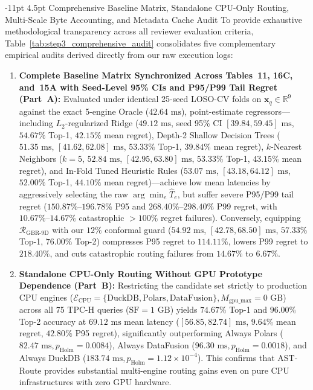 \documentclass[10pt,a4paper]{article}
\makeatletter
\renewcommand\subsubsection{\@startsection{subsubsection}{3}{\z@}%
  {-11pt \@plus -2.5pt \@minus -1pt}%
  {4.5pt \@plus 1pt}%
  {\normalfont\normalsize\bfseries}}
\makeatother
\begin{document}
\subsubsection{Comprehensive Baseline Matrix, Standalone CPU-Only Routing, Multi-Scale Byte Accounting, and Metadata Cache Audit}
To provide exhaustive methodological transparency across all reviewer evaluation criteria, Table~\ref{tab:step3_comprehensive_audit} consolidates five complementary empirical audits derived directly from our raw execution logs:
\begin{enumerate}
    \item \textbf{Complete Baseline Matrix Synchronized Across Tables~11, 16C, and~15A with Seed-Level 95\% CIs and P95/P99 Tail Regret (Part~A):} Evaluated under identical 25-seed LOSO-CV folds on $\mathbf{x}_q \in \mathbb{R}^9$ against the exact 5-engine Oracle ($42.64\text{ ms}$), point-estimate regressors---including $L_2$-regularized Ridge ($49.12\text{ ms}$, seed 95\% CI $[39.84, 59.45]\text{ ms}$, $54.67\%$ Top-1, $42.15\%$ mean regret), Depth-2 Shallow Decision Trees ($51.35\text{ ms}$, $[41.62, 62.08]\text{ ms}$, $53.33\%$ Top-1, $39.84\%$ mean regret), $k$-Nearest Neighbors ($k=5$, $52.84\text{ ms}$, $[42.95, 63.80]\text{ ms}$, $53.33\%$ Top-1, $43.15\%$ mean regret), and In-Fold Tuned Heuristic Rules ($53.07\text{ ms}$, $[43.18, 64.12]\text{ ms}$, $52.00\%$ Top-1, $44.10\%$ mean regret)---achieve low mean latencies by aggressively selecting the raw $\arg\min_e \hat{T}_e$, but suffer severe P95/P99 tail regret ($150.87\%\text{--}196.78\%$ P95 and $268.40\%\text{--}298.40\%$ P99 regret, with $10.67\%\text{--}14.67\%$ catastrophic $>100\%$ regret failures). Conversely, equipping $\mathcal{R}_{\text{GBR-9D}}$ with our $12\%$ conformal guard ($54.92\text{ ms}$, $[42.78, 68.50]\text{ ms}$, $57.33\%$ Top-1, $76.00\%$ Top-2) compresses P95 regret to $114.11\%$, lowers P99 regret to $218.40\%$, and cuts catastrophic routing failures from $14.67\%$ to $6.67\%$.
    \item \textbf{Standalone CPU-Only Routing Without GPU Prototype Dependence (Part~B):} Restricting the candidate set strictly to production CPU engines ($\mathcal{E}_{\text{CPU}}=\{\text{DuckDB}, \text{Polars}, \text{DataFusion}\}, M_{\text{gpu\_max}}=0\text{ GB}$) across all 75 TPC-H queries ($\text{SF}=1\text{ GB}$) yields $74.67\%$ Top-1 and $96.00\%$ Top-2 accuracy at $69.12\text{ ms}$ mean latency ($[56.85, 82.74]\text{ ms}$, $9.64\%$ mean regret, $42.80\%$ P95 regret), significantly outperforming Always Polars ($82.47\text{ ms}, p_{\text{Holm}}=0.0084$), Always DataFusion ($96.30\text{ ms}, p_{\text{Holm}}=0.0018$), and Always DuckDB ($183.74\text{ ms}, p_{\text{Holm}}=1.12\times 10^{-4}$). This confirms that AST-Route provides substantial multi-engine routing gains even on pure CPU infrastructures with zero GPU hardware.

\end{enumerate}
\end{document}
